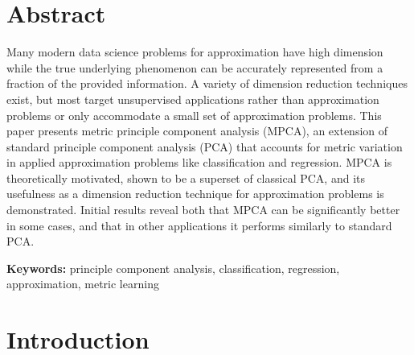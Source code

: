 \documentclass{scspaperproc}
\theoremstyle{scsthe}
\begin{document}


\section*{Abstract}

Many modern data science problems for approximation have high
dimension while the true underlying phenomenon can be accurately
represented from a fraction of the provided information. A variety of
dimension reduction techniques exist, but most target unsupervised
applications rather than approximation problems or only accommodate a
small set of approximation problems. This paper presents metric
principle component analysis (MPCA), an extension of standard
principle component analysis (PCA) that accounts for metric variation
in applied approximation problems like classification and
regression. MPCA is theoretically motivated, shown to be a superset of
classical PCA, and its usefulness as a dimension reduction technique
for approximation problems is demonstrated. Initial results reveal
both that MPCA can be significantly better in some cases, and that in
other applications it performs similarly to standard PCA.

\textbf{Keywords:} principle component analysis, classification,
regression, approximation, metric learning


\section{Introduction}
\label{sec:introduction}
\end{document}
